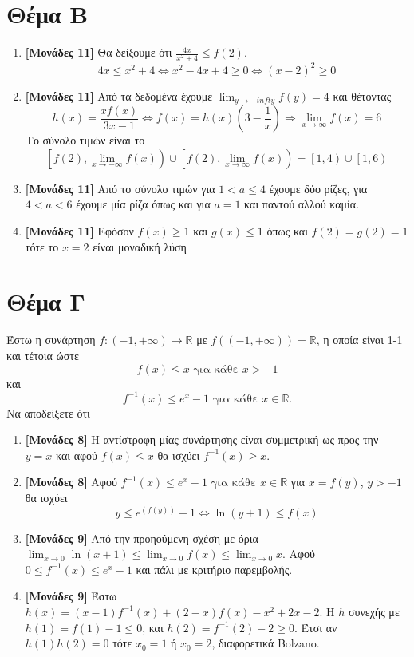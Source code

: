 \documentclass[12pt]{article}
\begin{document}
\section*{Θέμα Β}
  \noindent
  \begin{enumerate}
    \item \textbf{[Μονάδες 11]} Θα δείξουμε ότι $\frac{4x}{x^2+4}\le f(2)$.
    $$4x\le x^2+4 \iff x^2-4x+4\ge 0 \iff (x-2)^2\ge 0$$
    \item \textbf{[Μονάδες 11]} Από τα δεδομένα έχουμε $\lim_{y\to -infty}f(y)=4$ και θέτοντας
    $$h(x)=\frac{xf(x)}{3x-1} \iff f(x)=h(x)(3-\frac{1}{x}) \Rightarrow \lim_{x\to \infty}f(x)=6$$
    Το σύνολο τιμών είναι το
    $$\left[ f(2), \lim_{x\to -\infty}f(x) \right) \cup \left[ f(2), \lim_{x\to \infty}f(x) \right) = \left[1,4\right)\cup \left[1, 6\right)$$
    \item \textbf{[Μονάδες 11]} Από το σύνολο τιμών για $1< a \le 4$ έχουμε δύο ρίζες, για $4 < a < 6$ έχουμε μία ρίζα όπως και για $a=1$ και παντού αλλού καμία.
    \item \textbf{[Μονάδες 11]} Εφόσον $f(x)\ge 1$ και $g(x)\le 1$ όπως και $f(2)=g(2)=1$ τότε το $x=2$ είναι μοναδική λύση
  \end{enumerate}

\section*{Θέμα Γ}
  \noindent
  Έστω η συνάρτηση $f:(-1,+\infty)\to\mathbb{R}$ με $f\left((-1,+\infty)\right)=\mathbb{R}$, η οποία είναι 1-1 και τέτοια ώστε
  $$f(x)\le x \text{ για κάθε } x>-1$$
  και
  $$f^{-1}(x)\le e^x-1 \text{ για κάθε } x\in\mathbb{R}.$$
  Να αποδείξετε ότι
  \begin{enumerate}
    \item \textbf{[Μονάδες 8]} Η αντίστροφη μίας συνάρτησης είναι συμμετρική ως προς την $y=x$ και αφού $f(x)\le x$ θα ισχύει $f^{-1}(x)\ge x$.
    \item \textbf{[Μονάδες 8]} Αφού $f^{-1}(x)\le e^x-1 \text{ για κάθε } x\in\mathbb{R}$ για $x=f(y)$, $y>-1$ θα ισχύει
    $$y\le e^(f(y))-1 \iff \ln (y+1) \le f(x)$$
    \item \textbf{[Μονάδες 9]} Από την προηούμενη σχέση με όρια $\lim_{x\to 0}\ln(x+1)\le \lim_{x\to 0} f(x) \le \lim_{x\to 0}x$. Αφού $0\le f^{-1}(x)\le e^x-1$ και πάλι με κριτήριο παρεμβολής.
    \item \textbf{[Μονάδες 9]} Έστω $h(x)=(x-1)f^{-1}(x)+(2-x)f(x)-x^2+2x-2$. Η $h$ συνεχής με $h(1)=f(1)-1\le 0$, και $h(2)=f^{-1}(2)-2\ge 0$. Έτσι αν $h(1)h(2)=0$ τότε $x_0=1$ ή $x_0=2$, διαφορετικά Bolzano.
  \end{enumerate}
\end{document}
